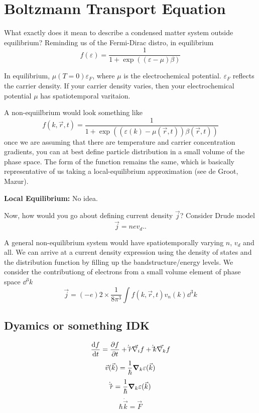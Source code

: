 \documentclass[a4paper]{article}
\begin{document}
\section*{Boltzmann Transport Equation}
What exactly does it mean to describe a condensed matter system
outside equilibrium? Reminding us of the Fermi-Dirac distro, in equilibrium
\begin{equation}
	f(\varepsilon) = \frac{1}{1 + \exp((\varepsilon - \mu)\beta)}
\end{equation}

In equilibrium, $\mu(T=0) \varepsilon_F$, where $\mu$ is the electrochemical potential.
$\varepsilon_F$ reflects the carrier density. If your carrier density
varies, then your electrochemical potential $\mu$ has spatiotemporal
varitaion.

A non-equiilbrium would look something like
\begin{equation}
	f(k,\vec{r},t) = \frac{1}{1 + \exp\left(\left( \varepsilon(k) - \mu(\vec r,t) \right)\beta(\vec{r}, t)\right) }
\end{equation}
once we are assuming that there are temperature and carrier concentration
gradients, you can at best define particle distribution in a small
volume of the phase space. The form of the function remains the same,
which is basically representative of us taking a local-equilibrium
approximation (see de Groot, Mazur).

\textbf{Local Equilibrium:} No idea.

Now, how would you go about defining current density $\vec{j}$?
Consider Drude model
\[
\vec{j} = nev_d.
.\] 

A general non-equilibrium system would have spatiotemporally varying
$n$, $v_d$ and all. We can arrive at a current density expression using
the density of states and the distribution function by filling up the
bandstructure/energy levels. We consider the contributiong of electrons
from a small volume element of phase space  $\dd ^3 k$
\begin{equation} \label{current_density}
	\vec{j} = (-e)2\times \frac{1}{8\pi^3}\int f(k, \vec{r}, t)v_n(k)\dd^3k
\end{equation}

\subsection*{Dyamics or something IDK}
\begin{equation}
	\frac{\dd f}{\dd t} = \pdv{f}{t} + \dot\vec r \vec{\nabla_i}f + \dot\vec{k}\vec{\nabla_k}f
\end{equation}
\begin{equation}
	\vec{v}(\vec{k}) = \frac{1}{\hbar}\grad_k\varepsilon(\vec{k})
\end{equation}
\begin{equation}
	\dot\vec{r} = \frac{1}{\hbar} \grad_k\varepsilon(\vec{k})
\end{equation}
\begin{equation}
	\hbar \dot{\vec{k}} = \vec{F}
\end{equation}
\end{document}
